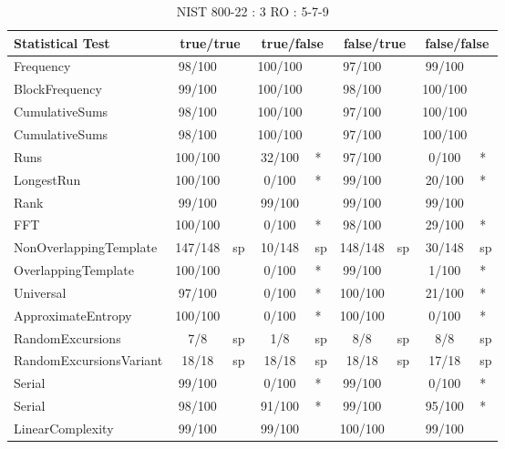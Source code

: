 \begin{table}[H]
\centering
\caption{NIST 800-22 : 3 RO : 5-7-9}
\label{tab:ch4_nist_22_3RO_21I}
\begin{tabular}{|l|c|l|c|l|c|l|c|l|}
\hline
\textbf{Statistical Test} & \multicolumn{2}{c|}{\textbf{true/true}} & \multicolumn{2}{c|}{\textbf{true/false}} & \multicolumn{2}{c|}{\textbf{false/true}} & \multicolumn{2}{c|}{\textbf{false/false}} \\ \hline
Frequency               &  98/100 &     & 100/100 &     &  97/100 &     &  99/100 &     \\ \hline
BlockFrequency          &  99/100 &     & 100/100 &     &  98/100 &     & 100/100 &     \\ \hline
CumulativeSums          &  98/100 &     & 100/100 &     &  97/100 &     & 100/100 &     \\ \hline
CumulativeSums          &  98/100 &     & 100/100 &     &  97/100 &     & 100/100 &     \\ \hline
Runs                    & 100/100 &     &  32/100 & *   &  97/100 &     &   0/100 & *   \\ \hline
LongestRun              & 100/100 &     &   0/100 & *   &  99/100 &     &  20/100 & *   \\ \hline
Rank                    &  99/100 &     &  99/100 &     &  99/100 &     &  99/100 &     \\ \hline
FFT                     & 100/100 &     &   0/100 & *   &  98/100 &     &  29/100 & *   \\ \hline
NonOverlappingTemplate  & 147/148 & sp  &  10/148 & sp  & 148/148 & sp  &  30/148 & sp  \\ \hline
OverlappingTemplate     & 100/100 &     &   0/100 & *   &  99/100 &     &   1/100 & *   \\ \hline
Universal               &  97/100 &     &   0/100 & *   & 100/100 &     &  21/100 & *   \\ \hline
ApproximateEntropy      & 100/100 &     &   0/100 & *   & 100/100 &     &   0/100 & *   \\ \hline
RandomExcursions        &     7/8 & sp  &     1/8 & sp  &     8/8 & sp  &     8/8 & sp  \\ \hline
RandomExcursionsVariant &   18/18 & sp  &   18/18 & sp  &   18/18 & sp  &   17/18 & sp  \\ \hline
Serial                  &  99/100 &     &   0/100 & *   &  99/100 &     &   0/100 & *   \\ \hline
Serial                  &  98/100 &     &  91/100 & *   &  99/100 &     &  95/100 & *   \\ \hline
LinearComplexity        &  99/100 &     &  99/100 &     & 100/100 &     &  99/100 &     \\ \hline
\end{tabular}
\end{table}

